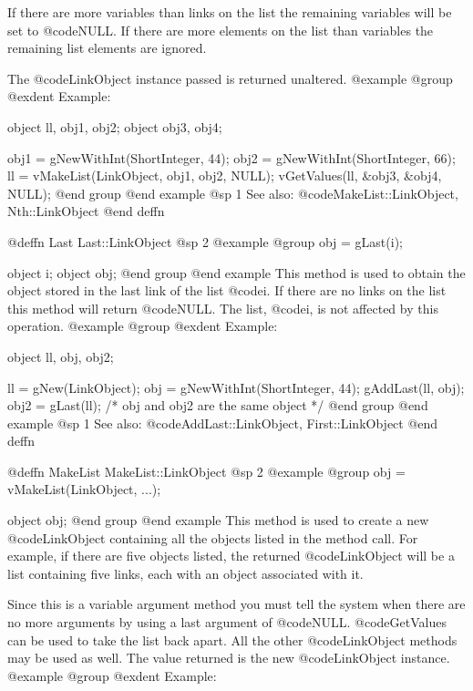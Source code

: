 If there are more variables than links on the list the remaining variables will be
set to @code{NULL}.  If there are more elements on the list than variables the
remaining list elements are ignored.

The @code{LinkObject} instance passed is returned unaltered.
@example
@group
@exdent Example:

object  ll, obj1, obj2;
object  obj3, obj4;

obj1 = gNewWithInt(ShortInteger, 44);
obj2 = gNewWithInt(ShortInteger, 66);
ll = vMakeList(LinkObject, obj1, obj2, NULL);
vGetValues(ll, &obj3, &obj4, NULL);
@end group
@end example
@sp 1
See also:  @code{MakeList::LinkObject, Nth::LinkObject}
@end deffn











@deffn {Last} Last::LinkObject
@sp 2
@example
@group
obj = gLast(i);

object  i;
object  obj;
@end group
@end example
This method is used to obtain the object stored in the last link of the
list @code{i}.  If there are no links on the list this method will
return @code{NULL}.  The list, @code{i}, is not affected by this operation.
@example
@group
@exdent Example:

object  ll, obj, obj2;

ll = gNew(LinkObject);
obj = gNewWithInt(ShortInteger, 44);
gAddLast(ll, obj);
obj2 = gLast(ll);
/* obj and obj2 are the same object  */
@end group
@end example
@sp 1
See also:  @code{AddLast::LinkObject, First::LinkObject}
@end deffn











@deffn {MakeList} MakeList::LinkObject
@sp 2
@example
@group
obj = vMakeList(LinkObject, ...);

object  obj;
@end group
@end example
This method is used to create a new @code{LinkObject} containing all the
objects listed in the method call.  For example, if there are five objects listed, the
returned @code{LinkObject} will be a list containing five links, each with
an object associated with it.

Since this is a variable argument method you must tell the system when there are no
more arguments by using a last argument of @code{NULL}.  @code{GetValues} can be used to
take the list back apart.  All the other @code{LinkObject} methods may be
used as well.  The value returned is the new
@code{LinkObject} instance.
@example
@group
@exdent Example:

